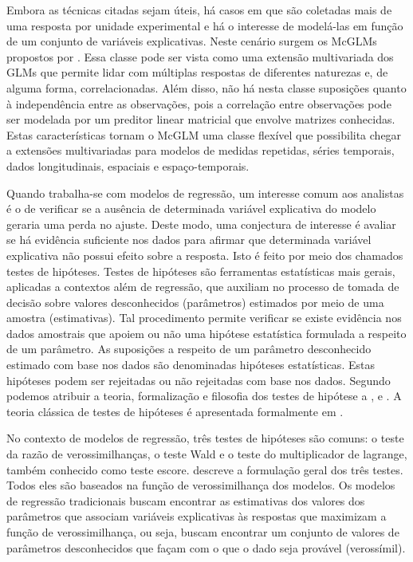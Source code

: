 Embora as técnicas citadas sejam úteis, há casos em que são coletadas mais de uma resposta por unidade experimental e há o interesse de modelá-las em função de um conjunto de variáveis explicativas. Neste cenário surgem os McGLMs propostos por \citet{Bonat16}. Essa classe pode ser vista como uma extensão multivariada dos GLMs que permite lidar com múltiplas respostas de diferentes naturezas e, de alguma forma, correlacionadas. Além disso, não há nesta classe suposições quanto à independência entre as observações, pois a correlação entre observações pode ser modelada por um preditor linear matricial que envolve matrizes conhecidas. Estas características tornam o McGLM uma classe flexível que possibilita chegar a extensões multivariadas para modelos de medidas repetidas, séries temporais, dados longitudinais, espaciais e espaço-temporais.


Quando trabalha-se com modelos de regressão, um interesse comum aos analistas é o de verificar se a ausência de determinada variável explicativa do modelo geraria uma perda no ajuste. Deste modo, uma conjectura de interesse é avaliar se há evidência suficiente nos dados para afirmar que determinada variável explicativa não possui efeito sobre a resposta. Isto é feito por meio dos chamados testes de hipóteses. Testes de hipóteses são ferramentas estatísticas mais gerais, aplicadas a contextos além de regressão, que auxiliam no processo de tomada de decisão sobre valores desconhecidos (parâmetros) estimados por meio de uma amostra (estimativas). Tal procedimento permite verificar se existe evidência nos dados amostrais que apoiem ou não uma hipótese estatística formulada a respeito de um parâmetro. As suposições a respeito de um parâmetro desconhecido estimado com base nos dados são denominadas hipóteses estatísticas. Estas hipóteses podem ser rejeitadas ou não rejeitadas com base nos dados. Segundo \citet{lehmann} podemos atribuir a teoria, formalização e filosofia dos testes de hipótese a \citet{neyman1}, \citet{neyman2} e \citet{fisher}. A teoria clássica de testes de hipóteses é apresentada formalmente em \citet{lehmann2}.

No contexto de modelos de regressão, três testes de hipóteses são comuns: o teste da razão de verossimilhanças, o teste Wald e o teste do multiplicador de lagrange, também conhecido como teste escore. \citet{engle} descreve a formulação geral dos três testes. Todos eles são baseados na função de verossimilhança dos modelos. Os modelos de regressão tradicionais buscam encontrar as estimativas dos valores dos parâmetros que associam variáveis explicativas às respostas que maximizam a função de verossimilhança, ou seja, buscam encontrar um conjunto de valores de parâmetros desconhecidos que façam com o que o dado seja provável (verossímil).

